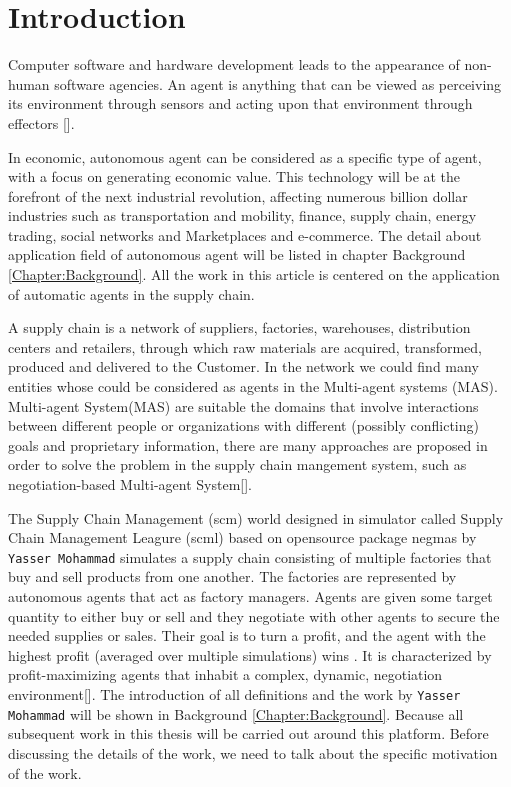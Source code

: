 \chapter{Introduction}
Computer software and hardware development leads to the appearance of non-human software agencies. An agent is anything that can be viewed as perceiving its environment through sensors and acting upon that environment through effectors [].

In economic, autonomous agent can be considered as a specific type of agent, with a focus on generating economic value. This technology will be at the forefront of the next industrial revolution, affecting numerous billion dollar industries such as transportation and mobility, finance, supply chain, energy trading, social networks and Marketplaces and e-commerce. The detail about application field of autonomous agent will be listed in chapter Background \ref{Chapter:Background}. All the work in this article is centered on the application of automatic agents in the supply chain.

A supply chain is a network of suppliers, factories, warehouses, distribution centers and retailers, through which raw materials are acquired, transformed, produced and delivered to the Customer. In the network we could find many entities whose could be considered as agents in the Multi-agent systems (MAS). Multi-agent System(MAS) are suitable the domains that involve interactions between different people or organizations with different (possibly conflicting) goals and proprietary information, there are many approaches are proposed in order to solve the problem in the supply chain mangement system, such as negotiation-based Multi-agent System[].

The Supply Chain Management (\gls{scm}) world designed in simulator called Supply Chain Management Leagure (\gls{scml}) based on opensource package \gls{negmas} by \texttt{Yasser Mohammad} simulates a supply chain consisting of multiple factories that buy and sell products from one another. The factories are represented by autonomous agents that act as factory managers. Agents are given some target quantity to either buy or sell and they negotiate with other agents to secure the needed supplies or sales. Their goal is to turn a profit, and the agent with the highest profit (averaged over multiple simulations) wins \parencite{Mohammad2019}. It is characterized by profit-maximizing agents that inhabit a complex, dynamic, negotiation environment[]. The introduction of all definitions and the work by \texttt{Yasser Mohammad} will be shown in Background \ref{Chapter:Background}. Because all subsequent work in this thesis will be carried out around this platform. Before discussing the details of the work, we need to talk about the specific motivation of the work.

